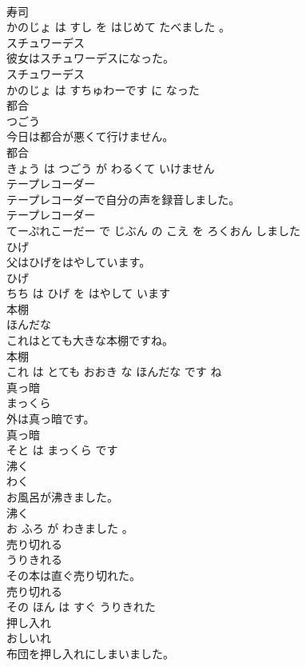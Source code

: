 \documentclass[8pt]{extreport}
\begin{document}
\begin{CJK}{UTF8}{min}
\\	寿司 
\\	かのじょ は すし を はじめて たべました 。			
\\	スチュワーデス	
\\	彼女はスチュワーデスになった。	
\\	スチュワーデス 
\\	かのじょ は すちゅわーです に なった			
\\	都合	
\\	つごう			
\\	今日は都合が悪くて行けません。	
\\	都合 
\\	きょう は つごう が わるくて いけません			
\\	テープレコーダー	
\\	テープレコーダーで自分の声を録音しました。	
\\	テープレコーダー 
\\	てーぷれこーだー で じぶん の こえ を ろくおん しました			
\\	ひげ	
\\	父はひげをはやしています。	
\\	ひげ 
\\	ちち は ひげ を はやして います			
\\	本棚	
\\	ほんだな			
\\	これはとても大きな本棚ですね。	
\\	本棚 
\\	これ は とても おおき な ほんだな です ね			
\\	真っ暗	
\\	まっくら			
\\	外は真っ暗です。	
\\	真っ暗 
\\	そと は まっくら です			
\\	沸く	
\\	わく			
\\	お風呂が沸きました。	
\\	沸く 
\\	お ふろ が わきました 。			
\\	売り切れる	
\\	うりきれる			
\\	その本は直ぐ売り切れた。	
\\	売り切れる 
\\	その ほん は すぐ うりきれた			
\\	押し入れ	
\\	おしいれ			
\\	布団を押し入れにしまいました。	

\end{CJK}
\end{document}
